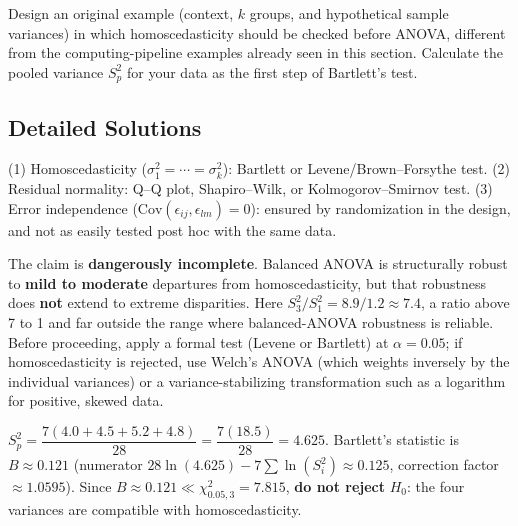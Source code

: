 \begin{problema}
\label{prob:095357b}
Design an original example (context, $k$ groups, and hypothetical sample variances) in which homoscedasticity should be checked before ANOVA, different from the computing-pipeline examples already seen in this section. Calculate the pooled variance $S_p^2$ for your data as the first step of Bartlett's test.
\end{problema}

\subsection*{Detailed Solutions}

\begin{solproblema}[prob:aa64893]
(1) Homoscedasticity ($\sigma_1^2=\cdots=\sigma_k^2$): Bartlett or Levene/Brown--Forsythe test. (2) Residual normality: Q--Q plot, Shapiro--Wilk, or Kolmogorov--Smirnov test. (3) Error independence ($\text{Cov}(\epsilon_{ij},\epsilon_{lm})=0$): ensured by randomization in the design, and not as easily tested post hoc with the same data.
\end{solproblema}

\begin{solproblema}[prob:e34d9fb]
The claim is \textbf{dangerously incomplete}. Balanced ANOVA is structurally robust to \textbf{mild to moderate} departures from homoscedasticity, but that robustness does \textbf{not} extend to extreme disparities. Here $S_3^2/S_1^2=8.9/1.2\approx7.4$, a ratio above 7 to 1 and far outside the range where balanced-ANOVA robustness is reliable. Before proceeding, apply a formal test (Levene or Bartlett) at $\alpha=0.05$; if homoscedasticity is rejected, use Welch's ANOVA (which weights inversely by the individual variances) or a variance-stabilizing transformation such as a logarithm for positive, skewed data.
\end{solproblema}

\begin{solproblema}[prob:57b555d]
$S_p^2=\dfrac{7(4.0+4.5+5.2+4.8)}{28}=\dfrac{7(18.5)}{28}=4.625$. Bartlett's statistic is $B\approx0.121$ (numerator $28\ln(4.625)-7\sum\ln(S_i^2)\approx0.125$, correction factor $\approx1.0595$). Since $B\approx0.121\ll\chi^2_{0.05,3}=7.815$, \textbf{do not reject} $H_0$: the four variances are compatible with homoscedasticity.
\end{solproblema}


